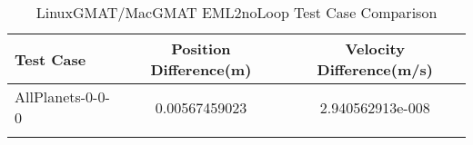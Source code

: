 \begin{table}[htbp!]
\centering
\caption{ LinuxGMAT/MacGMAT EML2noLoop Test Case Comparison}
      \begin{tabular}{lcc}
      \hline\hline
          Test Case & Position Difference(m) & Velocity Difference(m/s) \\
         \hline
         AllPlanets-0-0-0 & 0.00567459023 & 2.940562913e-008 \\
      \hline\hline
      \label{Table: EML2noLoop LinuxGMAT-MacGMAT Table} 
\end{tabular}
\end{table}
